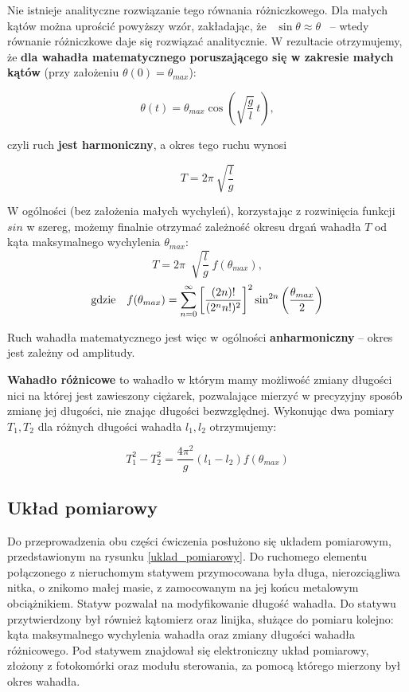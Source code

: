 \documentclass[a4paper]{article}
\newlength{\du}
\begin{document}
Nie istnieje analityczne rozwiązanie tego równania różniczkowego. Dla małych kątów
można uprościć powyższy wzór, zakładając, że \, $\sin\theta \approx \theta$ \,
-- wtedy równanie różniczkowe daje się rozwiązać analitycznie. W rezultacie otrzymujemy,
że \textbf{dla wahadła matematycznego poruszającego się w zakresie małych kątów}
(przy założeniu $\theta(0) = \theta_{max}$):

\[ \theta(t) = \theta_{max}\cos\left(\sqrt{\frac{g}{l}}\,t\right), \]

czyli ruch \textbf{jest harmoniczny}, a okres tego ruchu wynosi

\[ T = 2\pi~\sqrt{\frac{l}{g}} \]


W ogólności (bez założenia małych wychyleń), korzystając z rozwinięcia funkcji $sin$
w szereg, możemy finalnie otrzymać zależność okresu drgań wahadła $T$ od kąta
maksymalnego wychylenia $\theta_{max}$:
\begin{equation} \label{eq:T}
T = 2\pi ~ \sqrt[]{\frac{l}{g}}~f(\theta_{max}) ,
\end{equation}
\begin{equation} \label{eq:f}
\text{gdzie} \enskip  \enskip f(\theta_{max}) = 
	\sum\limits_{n=0}^{\infty} 
		\left[ \frac{(2n)!}{(2^nn!)^2} \right]^2 
			\sin^{2n}\left(\frac{\theta_{max}}{2} \right)
\end{equation}


Ruch wahadła matematycznego jest więc w ogólności \textbf{anharmoniczny} -- okres
jest zależny od amplitudy.

\textbf{Wahadło różnicowe} to wahadło w którym mamy możliwość zmiany długości nici na której 
jest zawieszony ciężarek, pozwalające
mierzyć w precyzyjny sposób zmianę jej długości, nie znając długości bezwzględnej. Wykonując dwa pomiary $T_1, T_2$ dla różnych długości wahadła $l_1, l_2$ otrzymujemy:

\[ T^2_1 - T^2_2 = \frac{4\pi ^2}{g}\left(l_1-l_2\right) f(\theta_{max}) \]

\subsection{Układ pomiarowy}
Do przeprowadzenia obu części ćwiczenia posłużono się układem pomiarowym,
przedstawionym na rysunku \ref{uklad_pomiarowy}. Do ruchomego elementu 
połączonego z nieruchomym statywem przymocowana była długa, nierozciągliwa nitka, 
o znikomo małej masie, z zamocowanym na jej końcu metalowym obciążnikiem. 
Statyw pozwalał na modyfikowanie długość wahadła. Do statywu 
przytwierdzony był również kątomierz oraz linijka, służące do pomiaru kolejno:
kąta maksymalnego wychylenia wahadła oraz zmiany długości wahadła różnicowego.
Pod statywem znajdował się elektroniczny układ pomiarowy, złożony z fotokomórki
oraz modułu sterowania, za pomocą którego mierzony był okres wahadła.
\end{document}
